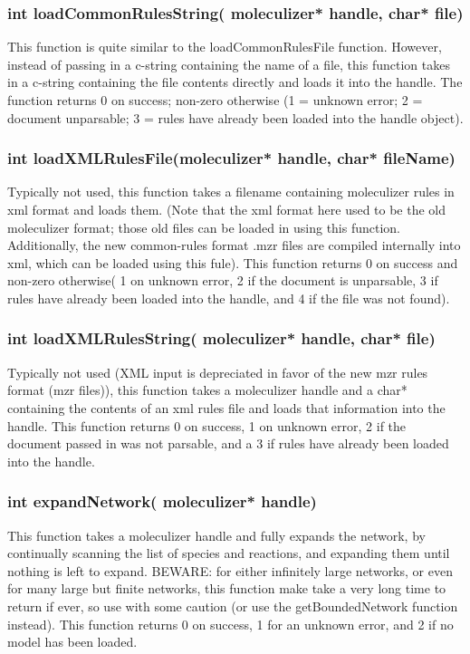 \subsubsection{int loadCommonRulesString( moleculizer* handle, char*
  file)}
This function is quite similar to the loadCommonRulesFile function.
However, instead of passing in a c-string containing the name of a
file, this function takes in a c-string containing the file contents
directly and loads it into the handle.  The function returns 0 on
success; non-zero otherwise (1 = unknown error; 2 = document
unparsable; 3 = rules have already been loaded into the handle object).

\subsubsection{int loadXMLRulesFile(moleculizer* handle, char*
  fileName)}
Typically not used, this function takes a filename containing
moleculizer rules in xml format and loads them.  (Note that the xml
format here used to be the old moleculizer format; those old files can
be loaded in using this function.  Additionally, the new common-rules
format .mzr files are compiled internally into xml, which can be
loaded using this fule).  This function returns 0 on success and
non-zero otherwise( 1 on unknown error, 2 if the document is
unparsable, 3 if rules have already been loaded into the handle, and 4
if the file was not found).

\subsubsection{int loadXMLRulesString( moleculizer* handle, char*
  file)}
Typically not used (XML input is depreciated in favor of the new
mzr rules format (mzr files)), this function takes a moleculizer
handle and a char* containing the contents of an xml rules file and
loads that information into the handle.  This function returns 0 on
success, 1 on unknown error, 2 if the document passed in was not
parsable, and a 3 if rules have already been loaded into the handle.  

\subsubsection{int expandNetwork( moleculizer* handle)}
This function takes a moleculizer handle and fully expands the
network, by continually scanning the list of species and reactions,
and expanding them until nothing is left to expand.  BEWARE: for
either infinitely large networks, or even for many large but finite
networks, this function make take a very long time to return if ever,
so use with some caution (or use the getBoundedNetwork function
instead).  This function returns 0 on success, 1 for an unknown error,
and 2 if no model has been loaded.  


